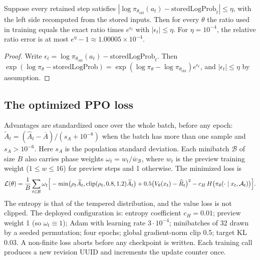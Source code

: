 \begin{proposition}
\label{prop:likelihood}
Suppose every retained step satisfies
$|\log\pi_{\theta_{\mathrm{old}}}(a_t)-\mathrm{storedLogProb}_t|\le\eta$, with
the left side recomputed from the stored inputs. Then for every $\theta$ the
ratio used in training equals the exact ratio times $e^{\epsilon_t}$ with
$|\epsilon_t|\le\eta$. For $\eta=10^{-4}$, the relative ratio error is at most
$e^{\eta}-1\approx1.00005\times10^{-4}$.
\end{proposition}
\begin{proof}
Write $\epsilon_t=\log\pi_{\theta_{\mathrm{old}}}(a_t)-\mathrm{storedLogProb}_t$.
Then $\exp(\log\pi_\theta-\mathrm{storedLogProb})
=\exp(\log\pi_\theta-\log\pi_{\theta_{\mathrm{old}}})e^{\epsilon_t}$, and
$|\epsilon_t|\le\eta$ by assumption.
\end{proof}


\subsection{The optimized PPO loss}
Advantages are standardized once over the whole batch, before any epoch:
$\widetilde A_t=(\widehat A_t-\overline A)/(s_A+10^{-8})$ when the batch has
more than one sample and $s_A>10^{-6}$. Here $s_A$ is the population
standard deviation. Each minibatch $\mathcal B$ of size $B$ also carries phase
weights $\omega_t=w_t/\overline w_{\mathcal B}$, where $w_t$ is the preview
training weight ($1\le w\le16$) for preview steps and 1 otherwise. The
minimized loss is
\begin{equation}
  \mathcal L(\theta)=\frac1B\sum_{t\in\mathcal B}\omega_t\Big[
   -\min\!\big(\rho_t\widetilde A_t,\operatorname{clip}(\rho_t,0.8,1.2)\widetilde A_t\big)
   +0.5\big(V_\theta(x_t)-\widehat R_t\big)^2
   -c_H\,H\big(\pi_\theta(\cdot\mid x_t,\mathcal{A}_t)\big)\Big].
\label{eq:loss}
\end{equation}
The entropy is that of the tempered distribution, and the value loss is not
clipped. The deployed configuration is: entropy coefficient $c_H=0.01$; preview
weight 1 (so $\omega_t\equiv1$); Adam with learning rate $3\cdot10^{-4}$;
minibatches of 32 drawn by a seeded permutation; four epochs; global
gradient-norm clip 0.5; target KL 0.03. A non-finite loss aborts before any
checkpoint is written. Each training call produces a new revision UUID and
increments the update counter once.

